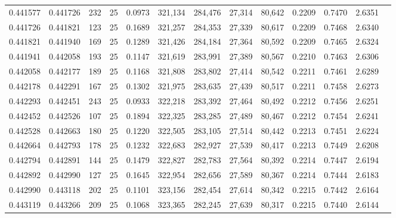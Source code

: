 \begin{tabular}{rrrrrrrrrrrrr}
0.441577 & 0.441726 &   232 &  25 &                                     0.0973 & 321,134 & 284,476 &  27,314 &  80,642 & 0.2209 & 0.7470 & 2.6351 \\
0.441726 & 0.441821 &   123 &  25 &                                     0.1689 & 321,257 & 284,353 &  27,339 &  80,617 & 0.2209 & 0.7468 & 2.6340 \\
0.441821 & 0.441940 &   169 &  25 &                                     0.1289 & 321,426 & 284,184 &  27,364 &  80,592 & 0.2209 & 0.7465 & 2.6324 \\
0.441941 & 0.442058 &   193 &  25 &                                     0.1147 & 321,619 & 283,991 &  27,389 &  80,567 & 0.2210 & 0.7463 & 2.6306 \\
0.442058 & 0.442177 &   189 &  25 &                                     0.1168 & 321,808 & 283,802 &  27,414 &  80,542 & 0.2211 & 0.7461 & 2.6289 \\
0.442178 & 0.442291 &   167 &  25 &                                     0.1302 & 321,975 & 283,635 &  27,439 &  80,517 & 0.2211 & 0.7458 & 2.6273 \\
0.442293 & 0.442451 &   243 &  25 &                                     0.0933 & 322,218 & 283,392 &  27,464 &  80,492 & 0.2212 & 0.7456 & 2.6251 \\
0.442452 & 0.442526 &   107 &  25 &                                     0.1894 & 322,325 & 283,285 &  27,489 &  80,467 & 0.2212 & 0.7454 & 2.6241 \\
0.442528 & 0.442663 &   180 &  25 &                                     0.1220 & 322,505 & 283,105 &  27,514 &  80,442 & 0.2213 & 0.7451 & 2.6224 \\
0.442664 & 0.442793 &   178 &  25 &                                     0.1232 & 322,683 & 282,927 &  27,539 &  80,417 & 0.2213 & 0.7449 & 2.6208 \\
0.442794 & 0.442891 &   144 &  25 &                                     0.1479 & 322,827 & 282,783 &  27,564 &  80,392 & 0.2214 & 0.7447 & 2.6194 \\
0.442892 & 0.442990 &   127 &  25 &                                     0.1645 & 322,954 & 282,656 &  27,589 &  80,367 & 0.2214 & 0.7444 & 2.6183 \\
0.442990 & 0.443118 &   202 &  25 &                                     0.1101 & 323,156 & 282,454 &  27,614 &  80,342 & 0.2215 & 0.7442 & 2.6164 \\
0.443119 & 0.443266 &   209 &  25 &                                     0.1068 & 323,365 & 282,245 &  27,639 &  80,317 & 0.2215 & 0.7440 & 2.6144 \\

\end{tabular}
